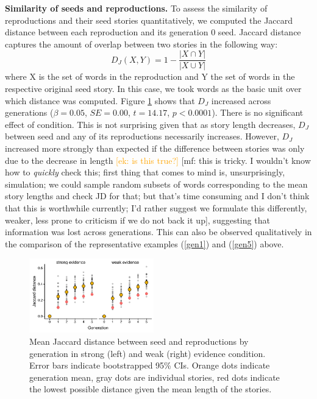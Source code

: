 \documentclass[10pt,letterpaper]{article}
\newcommand{\ek}[1]{\textcolor{Orange}{[ek: #1]}}
\newcommand{\mf}[1]{\textcolor{PinkyPurple}{[mf: #1]}}
\begin{document}
\textbf{Similarity of seeds and reproductions.} %
To assess the similarity of reproductions and their seed stories quantitatively, we computed the Jaccard distance between each reproduction and its generation 0 seed. Jaccard distance captures the amount of overlap between two stories in the following way: \[D_J(X,Y) = 1 - \frac{|X \cap Y|}{|X \cup Y|}\] where X is the set of words in the reproduction and Y the set of words in the respective original seed story. In this case, we took words as the basic unit over which distance was computed. Figure \ref{fig:jaccdistance} shows that $D_J$ increased across generations ($\beta = 0.05$, $SE = 0.00$, $t = 14.17$, $p < 0.0001$). There is no significant effect of condition. This is not surprising given that as story length decreases, $D_J$ between seed and any of its reproductions necessarily increases. However, $D_J$ increased more strongly than expected if the difference between stories was only due to the decrease in length \ek{is this true?} \mf{this is tricky. I wouldn't know how to \emph{quickly} check this; first thing that comes to mind is, unsurprisingly, simulation; we could sample random subsets of words corresponding to the mean story lengths and check JD for that; but that's time consuming and I don't think that this is worthwhile currently; I'd rather suggest we formulate this differently, weaker, less prone to criticism if we do not back it up}, suggesting that information was lost across generations. This can also be observed qualitatively in the comparison of the representative examples (\ref{gen1}) and (\ref{gen5}) above.

\begin{figure}[]
	\includegraphics[width=0.48\textwidth]{pics/jaccdistance.pdf}
	\caption{Mean Jaccard distance between seed and reproductions by generation in strong (left) and weak (right) evidence condition. Error bars indicate bootstrapped 95\% CIs. Orange dots indicate generation mean, gray dots are individual stories, red dots indicate the lowest possible distance given the mean length of the stories.} 
	\label{fig:jaccdistance}
\end{figure}
\end{document}
